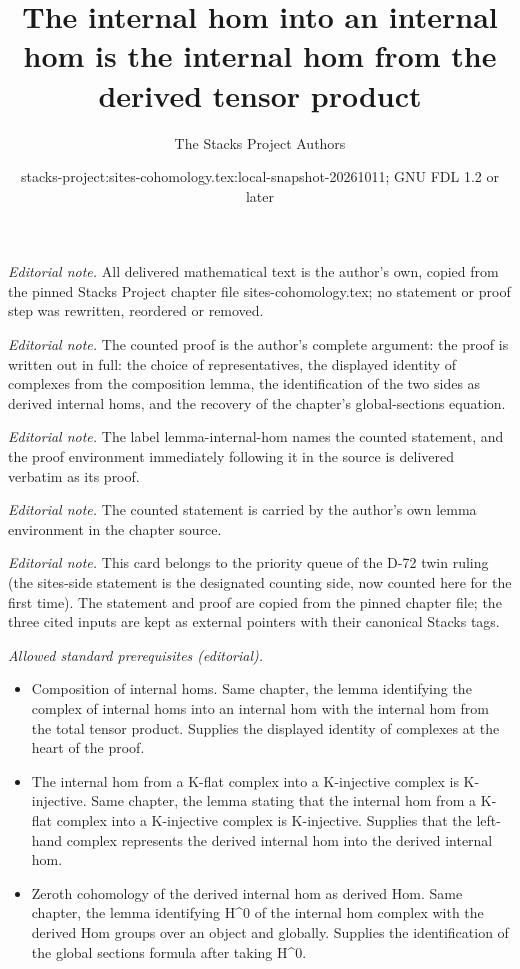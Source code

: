 \documentclass[10pt,a4paper]{amsart}
\title{The internal hom into an internal hom is the internal hom from the derived tensor product}
\author{The Stacks Project Authors}
\date{stacks-project:sites-cohomology.tex:local-snapshot-20261011; GNU FDL 1.2 or later}
\theoremstyle{plain}
\theoremstyle{definition}
\theoremstyle{remark}
\numberwithin{equation}{subsection}
\begin{document}
\maketitle
\noindent\textit{Editorial note.} All delivered mathematical text is the author's own, copied from the pinned Stacks Project chapter file sites-cohomology.tex; no statement or proof step was rewritten, reordered or removed.\par\medskip
\noindent\textit{Editorial note.} The counted proof is the author's complete argument: the proof is written out in full: the choice of representatives, the displayed identity of complexes from the composition lemma, the identification of the two sides as derived internal homs, and the recovery of the chapter's global-sections equation.\par\medskip
\noindent\textit{Editorial note.} The label lemma-internal-hom names the counted statement, and the proof environment immediately following it in the source is delivered verbatim as its proof.\par\medskip
\noindent\textit{Editorial note.} The counted statement is carried by the author's own lemma environment in the chapter source.\par\medskip
\noindent\textit{Editorial note.} This card belongs to the priority queue of the D-72 twin ruling (the sites-side statement is the designated counting side, now counted here for the first time). The statement and proof are copied from the pinned chapter file; the three cited inputs are kept as external pointers with their canonical Stacks tags.\par\medskip
\noindent\textit{Allowed standard prerequisites (editorial).}\begin{itemize}
\item Composition of internal homs. Same chapter, the lemma identifying the complex of internal homs into an internal hom with the internal hom from the total tensor product. Supplies the displayed identity of complexes at the heart of the proof.
\item The internal hom from a K-flat complex into a K-injective complex is K-injective. Same chapter, the lemma stating that the internal hom from a K-flat complex into a K-injective complex is K-injective. Supplies that the left-hand complex represents the derived internal hom into the derived internal hom.
\item Zeroth cohomology of the derived internal hom as derived Hom. Same chapter, the lemma identifying H\textasciicircum{}0 of the internal hom complex with the derived Hom groups over an object and globally. Supplies the identification of the global sections formula after taking H\textasciicircum{}0.
\end{itemize}\medskip
\end{document}
